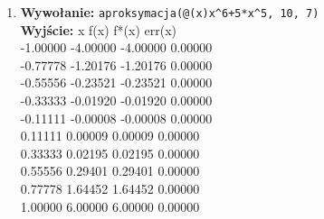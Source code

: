 \documentclass[]{article}
\begin{document}
\begin{enumerate}
\item \textbf{Wywołanie:} \verb|aproksymacja(@(x)x^6+5*x^5, 10, 7)|
\\\textbf{Wyjście:}
    x\hspace{15mm}         f(x)\hspace{15mm}       f*(x)\hspace{15mm}      err(x)\\
    -1.00000\hspace{5mm}  -4.00000\hspace{5mm}  -4.00000\hspace{5mm}   0.00000\\
    -0.77778\hspace{5mm}  -1.20176\hspace{5mm}  -1.20176\hspace{5mm}   0.00000\\
    -0.55556\hspace{5mm}  -0.23521\hspace{5mm}  -0.23521\hspace{5mm}   0.00000\\
    -0.33333\hspace{5mm}  -0.01920 \hspace{3mm} -0.01920\hspace{6mm}   0.00000\\
    -0.11111\hspace{5mm}  -0.00008\hspace{5mm}  -0.00008\hspace{5mm}   0.00000\\
    0.11111 \hspace{5mm}  0.00009 \hspace{5mm}  0.00009 \hspace{5mm}  0.00000\\
    0.33333 \hspace{5mm}  0.02195\hspace{7mm}   0.02195\hspace{5mm}   0.00000\\
    0.55556 \hspace{5mm}  0.29401\hspace{7mm}   0.29401\hspace{5mm}   0.00000\\
    0.77778 \hspace{5mm}  1.64452 \hspace{5mm}  1.64452\hspace{6mm}   0.00000\\
    1.00000 \hspace{5mm}  6.00000 \hspace{5mm}  6.00000 \hspace{5mm}  0.00000\\

\end{enumerate}
\end{document}
